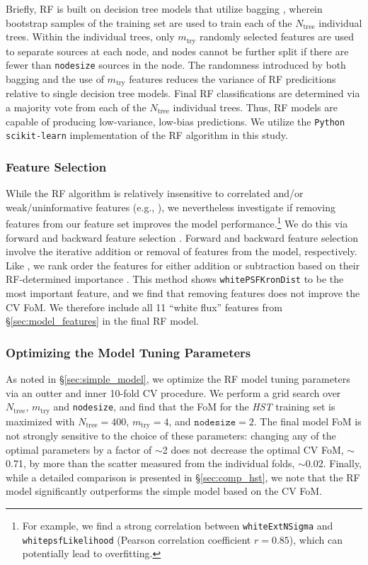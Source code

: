 \documentclass[twocolumn]{aastex62}
\begin{document}
\begin{CJK*}{UTF8}{gbsn}
Briefly, RF is built on decision tree models \citep{Quinlan93} that utilize
bagging \citep{Breiman96}, wherein bootstrap samples of the training set are
used to train each of the $N_{\mathrm{tree}}$ individual trees. Within the
individual trees, only $m_{\mathrm{try}}$ randomly selected features are
used to separate sources at each node, and nodes cannot be further split if
there are fewer than \texttt{nodesize} sources in the node. The randomness
introduced by both bagging and the use of $m_{\mathrm{try}}$ features
reduces the variance of RF predicitions relative to single decision tree
models. Final RF classifications are determined via a majority vote from
each of the $N_{\mathrm{tree}}$ individual trees. Thus, RF models are
capable of producing low-variance, low-bias predictions. We utilize the
\texttt{Python scikit-learn} implementation of the RF algorithm
\citep{Pedregosa12} in this study.

\subsubsection{Feature Selection}

While the RF algorithm is relatively insensitive to correlated and/or
weak/uninformative features (e.g., \citealt{Richards12a}), we nevertheless
investigate if removing features from our feature set improves the model
performance.\footnote{For example, we find a strong correlation between
\texttt{whiteExtNSigma} and \texttt{whitepsfLikelihood} (Pearson correlation
coefficient $r = 0.85$), which can potentially lead to overfitting.} We do
this via forward and backward feature selection \citep{Guyon03}. Forward and
backward feature selection involve the iterative addition or removal of
features from the model, respectively. Like \citet{Richards12a}, we rank
order the features for either addition or subtraction based on their
RF-determined importance \citep{Breiman02}. This method shows
\texttt{whitePSFKronDist} to be the most important feature, and we find that
removing features does not improve the CV FoM. We therefore include all 11
``white flux'' features from \S\ref{sec:model_features} in the final RF
model.

\subsubsection{Optimizing the Model Tuning Parameters}

As noted in \S\ref{sec:simple_model}, we optimize the RF model tuning
parameters via an outter and inner 10-fold CV procedure. We perform a grid
search over $N_{\mathrm{tree}}$, $m_{\mathrm{try}}$ and \texttt{nodesize},
and find that the FoM for the \textit{HST} training set is maximized with
$N_{\mathrm{tree}} = 400$, $m_{\mathrm{try}} = 4$, and $\mathtt{nodesize} =
2$. The final model FoM is not strongly sensitive to the choice of these
parameters: changing any of the optimal parameters by a factor of $\sim$2
does not decrease the optimal CV FoM, $\sim$0.71, by more than the scatter
measured from the individual folds, $\sim$0.02. Finally, while a detailed
comparison is presented in \S\ref{sec:comp_hst}, we note that the RF model
significantly outperforms the simple model based on the CV FoM.


\end{CJK*}
\end{document}
